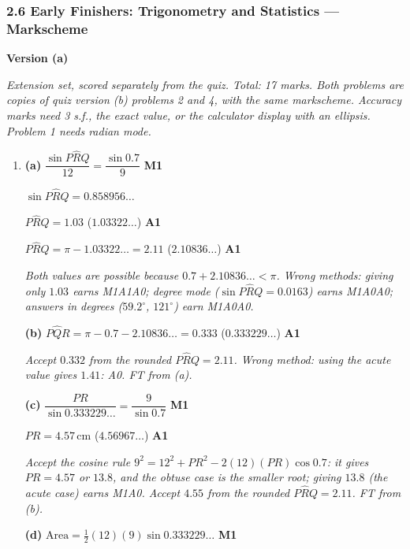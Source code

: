 \documentclass[12pt, twoside]{article}
\begin{document}
\subsubsection*{2.6 Early Finishers: Trigonometry and Statistics --- Markscheme}

\textbf{\large Version (a)}

\emph{Extension set, scored separately from the quiz. Total: 17 marks. Both
problems are copies of quiz version (b) problems 2 and 4, with the same
markscheme. Accuracy marks need 3 s.f., the exact value, or the calculator
display with an ellipsis. Problem 1 needs radian mode.}

\begin{enumerate}[itemsep=0.3cm]

\item[1.] [Maximum mark: 8]

\textbf{(a)} $\dfrac{\sin P\hat{R}Q}{12} = \dfrac{\sin 0.7}{9}$ \hfill \textbf{M1}

$\sin P\hat{R}Q = 0.858956\ldots$

$P\hat{R}Q = 1.03$ \quad ($1.03322\ldots$) \hfill \textbf{A1}

$P\hat{R}Q = \pi - 1.03322\ldots = 2.11$ \quad ($2.10836\ldots$) \hfill \textbf{A1}

\emph{Both values are possible because $0.7 + 2.10836\ldots < \pi$. Wrong
methods: giving only $1.03$ earns M1A1A0; degree mode ($\sin P\hat{R}Q =
0.0163$) earns M1A0A0; answers in degrees ($59.2^\circ$, $121^\circ$) earn
M1A0A0.}

\textbf{(b)} $P\hat{Q}R = \pi - 0.7 - 2.10836\ldots = 0.333$ \quad ($0.333229\ldots$) \hfill \textbf{A1}

\emph{Accept $0.332$ from the rounded $P\hat{R}Q = 2.11$. Wrong method:
using the acute value gives $1.41$: A0. FT from (a).}

\textbf{(c)} $\dfrac{PR}{\sin 0.333229\ldots} = \dfrac{9}{\sin 0.7}$ \hfill \textbf{M1}

$PR = 4.57\,\text{cm}$ \quad ($4.56967\ldots$) \hfill \textbf{A1}

\emph{Accept the cosine rule $9^{2} = 12^{2} + PR^{2} - 2(12)(PR)\cos 0.7$:
it gives $PR = 4.57$ or $13.8$, and the obtuse case is the smaller root;
giving $13.8$ (the acute case) earns M1A0. Accept $4.55$ from the rounded
$P\hat{R}Q = 2.11$. FT from (b).}

\textbf{(d)} $\text{Area} = \frac{1}{2}(12)(9)\sin 0.333229\ldots$ \hfill \textbf{M1}


\end{enumerate}
\end{document}
